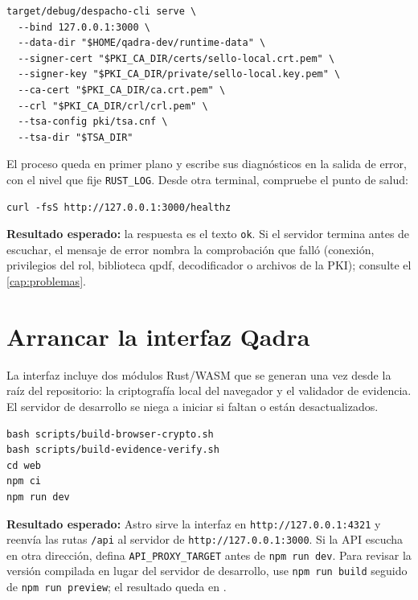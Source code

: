 \begin{verbatim}
target/debug/despacho-cli serve \
  --bind 127.0.0.1:3000 \
  --data-dir "$HOME/qadra-dev/runtime-data" \
  --signer-cert "$PKI_CA_DIR/certs/sello-local.crt.pem" \
  --signer-key "$PKI_CA_DIR/private/sello-local.key.pem" \
  --ca-cert "$PKI_CA_DIR/ca.crt.pem" \
  --crl "$PKI_CA_DIR/crl/crl.pem" \
  --tsa-config pki/tsa.cnf \
  --tsa-dir "$TSA_DIR"
\end{verbatim}

El proceso queda en primer plano y escribe sus diagnósticos en la salida de
error, con el nivel que fije \texttt{RUST\_LOG}. Desde otra terminal,
compruebe el punto de salud:

\begin{verbatim}
curl -fsS http://127.0.0.1:3000/healthz
\end{verbatim}

\textbf{Resultado esperado:} la respuesta es el texto \texttt{ok}. Si el
servidor termina antes de escuchar, el mensaje de error nombra la
comprobación que falló (conexión, privilegios del rol, biblioteca qpdf,
decodificador o archivos de la PKI); consulte el \cref{cap:problemas}.

\section{Arrancar la interfaz Qadra}\label{sec:inst-web}

La interfaz incluye dos módulos Rust/WASM que se generan una vez desde la
raíz del repositorio: la criptografía local del navegador y el validador de
evidencia. El servidor de desarrollo se niega a iniciar si faltan o están
desactualizados.

\begin{verbatim}
bash scripts/build-browser-crypto.sh
bash scripts/build-evidence-verify.sh
cd web
npm ci
npm run dev
\end{verbatim}

\textbf{Resultado esperado:} Astro sirve la interfaz en
\texttt{http://127.0.0.1:4321} y reenvía las rutas \texttt{/api} al servidor
de \texttt{http://127.0.0.1:3000}. Si la API escucha en otra dirección,
defina \texttt{API\_PROXY\_TARGET} antes de \texttt{npm run dev}. Para
revisar la versión compilada en lugar del servidor de desarrollo, use
\texttt{npm run build} seguido de \texttt{npm run preview}; el resultado
queda en .

